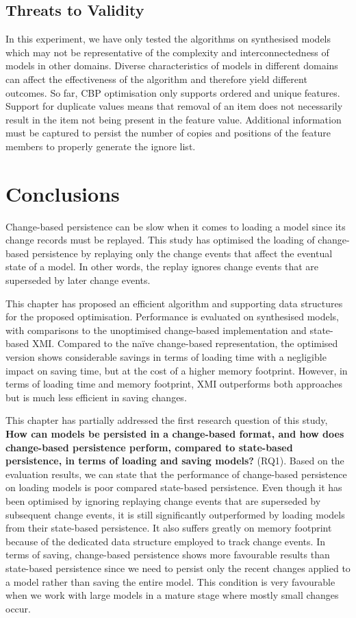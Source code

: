   \subsection{Threats to Validity}
  \label{sec:threats_to_validity_5}
  In this experiment, we have only tested the algorithms on synthesised models which may not be representative of the complexity and interconnectedness of models in other domains. Diverse characteristics of models in different domains can affect the effectiveness of the algorithm and therefore yield different outcomes. So far, CBP optimisation only supports ordered and unique features. Support for duplicate values means that removal of an item does not necessarily result in the item not being present in the feature value. Additional information must be captured to persist the number of copies and positions of the feature members to properly generate the ignore list.
  
  \section{Conclusions}
  \label{sec:conclusions_4}
  Change-based persistence can be slow when it comes to loading a model since its change records must be replayed. This study has optimised the loading of change-based persistence by replaying only the change events that affect the eventual state of a model. In other words, the replay ignores change events that are superseded by later change events.
  
  This chapter has proposed an efficient algorithm and supporting data structures for the proposed optimisation. Performance is evaluated on synthesised models, with comparisons to the unoptimised change-based implementation and state-based XMI. Compared to the naïve change-based representation, the optimised version shows considerable savings in terms of loading time with a negligible impact on saving time, but at the cost of a higher memory footprint. However, in terms of loading time and memory footprint, XMI outperforms both approaches but is much less efficient in saving changes.
  
  This chapter has partially addressed the first research question of this study, \textbf{How can models be persisted in a change-based format, and how does change-based persistence perform, compared to state-based persistence, in terms of loading and saving models?} (RQ1). Based on the evaluation results, we can state that the performance of change-based persistence on loading models is poor compared state-based persistence. Even though it has been optimised by ignoring replaying change events that are superseded by subsequent change events, it is still significantly outperformed by loading models from their state-based persistence. It also suffers greatly on memory footprint because of the dedicated data structure employed to track change events. In terms of saving, change-based persistence shows more favourable results than state-based persistence since we need to persist only the recent changes applied to a model rather than saving the entire model. This condition is very favourable when we work with large models in a mature stage where mostly small changes occur.
  
